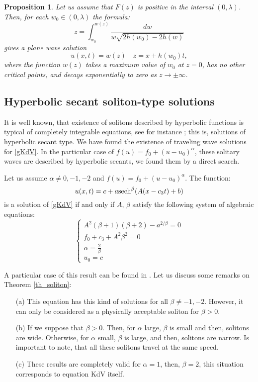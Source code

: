 \documentclass[
11pt,%
tightenlines,%
twoside,%
onecolumn,%
nofloats,%
nobibnotes,%
nofootinbib,%
superscriptaddress,%
noshowpacs,%
centertags]%
{revtex4}
\newtheorem{proposition}{Proposition}
\begin{document}
\begin{proposition}
Let us assume that $F(z)$ is positive in the interval $(0,\lambda)$. Then, for each 
$w_0\in (0,\lambda)$ the formula: 
$$z = \int_{w_0}^{w(z)} \frac{dw}{w\sqrt{2h(w_0) - 2h(w)}}$$
gives a plane wave solution
$$u(x,t) = w(z) \quad z = x + h(w_0)t,$$
where the function $w(z)$ takes a maximum value of $w_0$ at $z= 0$, has no other critical points, and decays exponentially to zero as $z\to \pm\infty$. 
\end{proposition}

\subsection{Hyperbolic secant soliton-type solutions}

It is well known, that existence of solitons described by hyperbolic functions
is typical of completely integrable equations, see for instance \cite{Zabusky1965, Drazin1989}; this is, solutions of hyperbolic secant type. We have found the existence of traveling wave solutions for \eqref{gKdV}. In the particular case of $f(u) = f_0 + (u-u_0)^\alpha$, these solitary waves are described by hyperbolic secants, we found them by a direct search. 
 
 \begin{theorem}\label{th_soliton}
Let us assume $\alpha \neq 0, -1, -2$ and $f(u) = f_0 + (u-u_0)^\alpha$. 
The function:
\begin{equation}
u(x,t) = c + a {\rm sech}^\beta(A(x-c_3t)+b)
\end{equation}
is a solution of \eqref{gKdV} 
if and only if $A$, $\beta$ satisfy the following system of algebraic equations:
\begin{equation}
\begin{cases}
A^{2}(\beta+1)(\beta+2)-a^{2/\beta}=0
 \\
f_{0}+c_{3}+A^{2}\beta^{2}=0
  \\
\alpha=\frac{2}{\beta}
   \\
   u_{0}=c
 \end{cases}
\end{equation}
\end{theorem}

A particular case of this result can be found in \cite{Smyth1995}. Let us discuss some remarks on Theorem \ref{th_soliton}:

\begin{itemize}
\item[(a)] This equation has this kind of solutions for all $\beta\neq -1,-2
$. However, it can only be considered as a physically acceptable soliton for $\beta>0 $.

\item[(b)] If we suppose that $\beta>0$.  Then, for $\alpha $   large, $\beta $   is small and then, solitons are wide. Otherwise, for $\alpha $   small, $\beta $ is large, and then, solitons are narrow. Is important to note, that all these solitons travel at the same speed.

\item [(c)] These  results are completely valid for $\alpha = 1$, then, $\beta =2$, this situation corresponds to equation KdV itself.
\end{itemize} 
 
\end{document}
